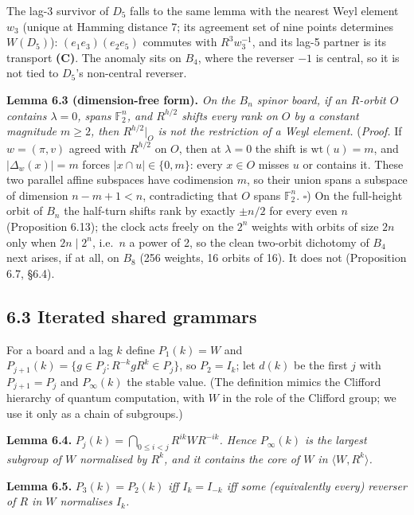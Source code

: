 \documentclass[
]{article}
\begin{document}
The lag-3 survivor of \(D_5\) falls to the same lemma with the nearest
Weyl element \(w_3\) (unique at Hamming distance 7; its agreement set of
nine points determines \(W(D_5)\)): \((e_1e_3)(e_2e_5)\) commutes with
\(R^3w_3^{-1}\), and its lag-5 partner is its transport \textbf{(C)}.
The anomaly sits on \(B_4\), where the reverser \(-1\) is central, so it
is not tied to \(D_5\)'s non-central reverser.

\textbf{Lemma 6.3 (dimension-free form).} \emph{On the \(B_n\) spinor
board, if an \(R\)-orbit \(O\) contains \(\lambda = 0\), spans
\(\mathbb{F}_2^n\), and \(R^{h/2}\) shifts every rank on \(O\) by a
constant magnitude \(m \ge 2\), then \(R^{h/2}|_O\) is not the
restriction of a Weyl element.} (\emph{Proof.} If \(w = (\pi, v)\)
agreed with \(R^{h/2}\) on \(O\), then at \(\lambda = 0\) the shift is
\(\mathrm{wt}(u) = m\), and \(|\Delta_w(x)| = m\) forces
\(|x \cap u| \in \{0, m\}\): every \(x \in O\) misses \(u\) or contains
it. These two parallel affine subspaces have codimension \(m\), so their
union spans a subspace of dimension \(n - m + 1 < n\), contradicting
that \(O\) spans \(\mathbb{F}_2^n\). \(\square\)) On the full-height
orbit of \(B_n\) the half-turn shifts rank by exactly \(\pm n/2\) for
every even \(n\) (Proposition 6.13); the clock acts freely on the
\(2^n\) weights with orbits of size \(2n\) only when \(2n \mid 2^n\),
i.e.~\(n\) a power of 2, so the clean two-orbit dichotomy of \(B_4\)
next arises, if at all, on \(B_8\) (256 weights, 16 orbits of 16). It
does not (Proposition 6.7, §6.4).

\subsection{6.3 Iterated shared
grammars}\label{iterated-shared-grammars}

For a board and a lag \(k\) define \(P_1(k) = W\) and
\(P_{j+1}(k) = \{g \in P_j : R^{-k}gR^k \in P_j\}\), so \(P_2 = I_k\);
let \(d(k)\) be the first \(j\) with \(P_{j+1} = P_j\) and
\(P_\infty(k)\) the stable value. (The definition mimics the Clifford
hierarchy of quantum computation, with \(W\) in the role of the Clifford
group; we use it only as a chain of subgroups.)

\textbf{Lemma 6.4.}
\emph{\(P_j(k) = \bigcap_{0 \le i < j} R^{ik} W R^{-ik}\). Hence
\(P_\infty(k)\) is the largest subgroup of \(W\) normalised by \(R^k\),
and it contains the core of \(W\) in \(\langle W, R^k \rangle\).}

\textbf{Lemma 6.5.} \emph{\(P_3(k) = P_2(k)\) iff \(I_k = I_{-k}\) iff
some (equivalently every) reverser of \(R\) in \(W\) normalises
\(I_k\).}
\end{document}
